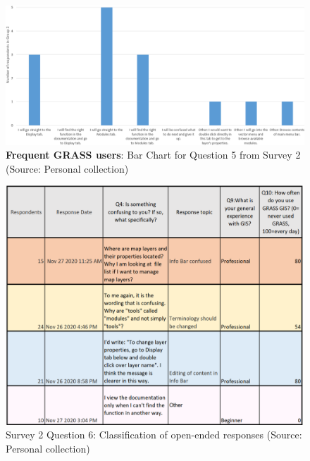 \documentclass[a4paper,10pt,twoside]{article}
\begin{document}
\newpage
\begin{figure}[hbt!] 
\begin{center}
\includegraphics[width=17cm]{../surveys/analyzed_data/survey2_question5_histogram_group2.png} 
\caption[\textbf{Frequent GRASS users}: Bar Chart for Question 5 from Survey 2]{\textbf{Frequent GRASS users}: Bar Chart for Question 5 from Survey 2 (Source: Personal collection)}
\label{fig:survey2_question5_histogram_group2}
\end{center}
\end{figure}

\begin{figure}[hbt!] 
\begin{center}
\includegraphics[width=14.5cm]{../surveys/analyzed_data/survey2_question6.png} 
\caption[Survey 2 Question 6: Classification of open-ended responses]{Survey 2 Question 6: Classification of open-ended responses (Source: Personal collection)}
\label{fig:survey2_question6}
\end{center}
\end{figure}
\end{document}
